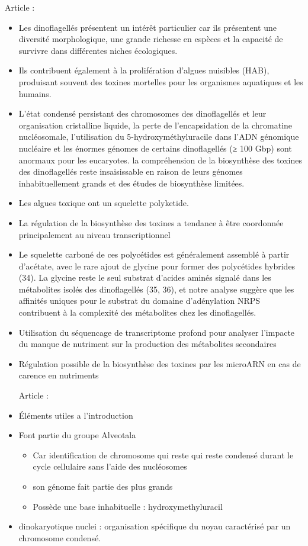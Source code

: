 \documentclass{article}
\begin{document}
Article \cite{beedessee2020integrated} :
\begin{itemize}
    \item Les dinoflagellés présentent un intérêt particulier car ils présentent une diversité morphologique, une grande richesse en espèces et la capacité de survivre dans différentes niches écologiques.
    \item Ils contribuent également à la prolifération d'algues nuisibles (HAB), produisant souvent des toxines mortelles pour les organismes aquatiques et les humains. 
    \item L'état condensé persistant des chromosomes des dinoflagellés et leur organisation cristalline liquide, la perte de l'encapsidation de la chromatine nucléosomale, l'utilisation du 5-hydroxyméthyluracile dans l'ADN génomique nucléaire et les énormes génomes de certains dinoflagellés (≥ 100 Gbp) sont anormaux pour les eucaryotes. la compréhension de la biosynthèse des toxines des dinoflagellés reste insaisissable en raison de leurs génomes inhabituellement grands et des études de biosynthèse limitées. 
    \item Les algues toxique ont un squelette polyketide.
    \item La régulation de la biosynthèse des toxines a tendance à être coordonnée principalement au niveau transcriptionnel 
    \item Le squelette carboné de ces polycétides est généralement assemblé à partir d'acétate, avec le rare ajout de glycine pour former des polycétides hybrides (34). La glycine reste le seul substrat d'acides aminés signalé dans les métabolites isolés des dinoflagellés (35, 36), et notre analyse suggère que les affinités uniques pour le substrat du domaine d'adénylation NRPS contribuent à la complexité des métabolites chez les dinoflagellés. 
    \item Utilisation du séquencage de transcriptome profond pour analyser l'impacte du manque de nutriment sur la production des métabolites secondaires
    \item Régulation possible de la biosynthèse des toxines par les microARN en cas de carence en nutriments 

Article \cite{wisecaver2011dinoflagellate} :
\item Éléments utiles a l'introduction
\item Font partie du groupe Alveotala
\begin{itemize}
    \item Car identification de chromosome qui reste qui reste condensé durant le cycle cellulaire sans l'aide des nucléosomes 
    \item son génome fait partie des plus grands
    \item Possède une base inhabituelle : hydroxymethyluracil
\end{itemize}
\item dinokaryotique nuclei : organisation spécifique du noyau caractérisé par un chromosome condensé. 

\end{itemize}
\end{document}
